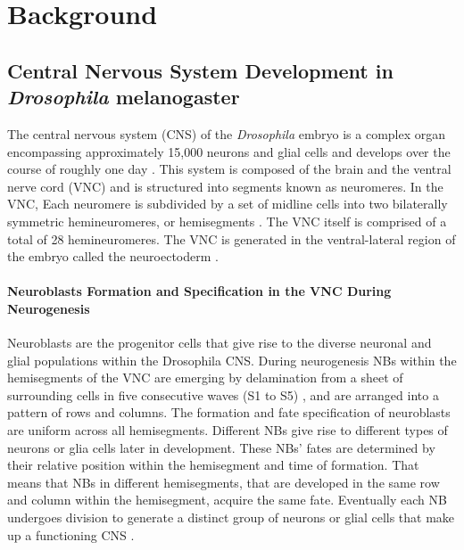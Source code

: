 \chapter{Background}\label{chap:background}
\section{Central Nervous System Development in \textit{Drosophila} melanogaster}
The central nervous system (CNS) of the \textit{Drosophila} embryo is a complex organ encompassing approximately 15,000 
neurons and glial cells and develops over the course of roughly one day \cite{Crews2019,ito1995distribution,heckscher2014atlas,cobeta2017anterior,yaghmaeian2018evolutionarily}. 
This system is composed of the brain and the ventral nerve cord (VNC) and is structured into segments known as neuromeres. 
In the VNC, Each neuromere is subdivided by a set of midline cells into two bilaterally symmetric hemineuromeres, 
or hemisegments \cite{urbach2016gene,Crews2019}. The VNC itself is comprised of a total of 28 hemineuromeres. 
The VNC is generated in the ventral-lateral region of the embryo called the neuroectoderm \cite{Crews2019}.  

\subsubsection{Neuroblasts Formation and Specification in the VNC During Neurogenesis}
Neuroblasts are the progenitor cells that give rise to the diverse neuronal and glial populations within the Drosophila CNS. 
During neurogenesis NBs within the hemisegments of the VNC are emerging by delamination from a sheet of surrounding cells in 
five consecutive waves (S1 to S5) \cite{bossing1996embryonic}, and are arranged into a pattern of rows and columns. 
The formation and fate specification of neuroblasts are uniform across all hemisegments. Different NBs give rise to different 
types of neurons or glia cells later in development. These NBs' fates are determined by their relative position within the 
hemisegment and time of formation. 
That means that NBs in different hemisegments, that are developed in the same row and column within the hemisegment, 
acquire the same fate. 
Eventually each NB undergoes division to generate a distinct group of neurons or glial cells that make up a functioning CNS 
\cite{Skeath1999}. 

